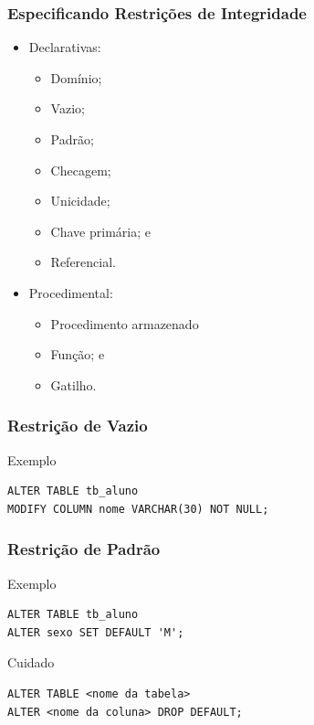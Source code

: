 \documentclass{beamer}
\begin{document}
\begin{frame}
\frametitle{Especificando Restrições de Integridade}

\begin{itemize}
	\item Declarativas:
	\begin{itemize}
		\item Domínio;
		\item Vazio;
		\item Padrão;
		\item Checagem;
		\item Unicidade;
		\item Chave primária; e
		\item Referencial.
	\end{itemize}
	\item Procedimental:
	\begin{itemize}
	\item Procedimento armazenado
	\item Função; e
	\item Gatilho.
	\end{itemize}
\end{itemize}
\end{frame}

\begin{frame}[fragile]
\frametitle{Restrição de Vazio}

\begin{exampleblock}{Exemplo}
\begin{lstlisting}
ALTER TABLE tb_aluno
MODIFY COLUMN nome VARCHAR(30) NOT NULL;
\end{lstlisting}
\end{exampleblock}
\end{frame}

\begin{frame}[fragile]
\frametitle{Restrição de Padrão}

\begin{exampleblock}{Exemplo}
\begin{lstlisting}
ALTER TABLE tb_aluno
ALTER sexo SET DEFAULT 'M';
\end{lstlisting}
\end{exampleblock}\vfill

\begin{alertblock}{Cuidado}
	\begin{lstlisting}
ALTER TABLE <nome da tabela>
ALTER <nome da coluna> DROP DEFAULT;
	\end{lstlisting}
\end{alertblock}
\end{frame}
\end{document}
